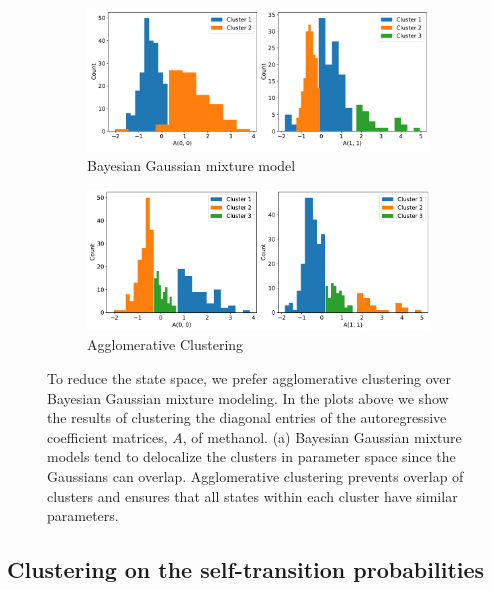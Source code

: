 \documentclass{article}
\begin{document}
  \begin{figure}[h]
  \centering
  \begin{subfigure}{0.95\textwidth}
  \includegraphics[width=\textwidth]{bayesian_A.pdf}
  \caption{Bayesian Gaussian mixture model}\label{fig:bayesian_A}
  \end{subfigure}
  \begin{subfigure}{0.95\textwidth}
  \includegraphics[width=\textwidth]{agglomerative_A.pdf}
  \caption{Agglomerative Clustering}\label{fig:agglomerative_A}
  \end{subfigure}
  \caption{To reduce the state space, we prefer agglomerative clustering over Bayesian
  Gaussian mixture modeling. In the plots above we show the results of clustering the
  diagonal entries of the autoregressive coefficient matrices, $A$, of methanol. (a) 
  Bayesian Gaussian mixture models tend to delocalize the clusters in parameter space
  since the Gaussians can overlap. Agglomerative clustering prevents overlap of 
  clusters and ensures that all states within each cluster have similar parameters.
  }\label{fig:clustering_choice}
  \end{figure}
  
  \newpage
  
  \subsection{Clustering on the self-transition probabilities}\label{section:selfT_cluster}
  
\end{document}

